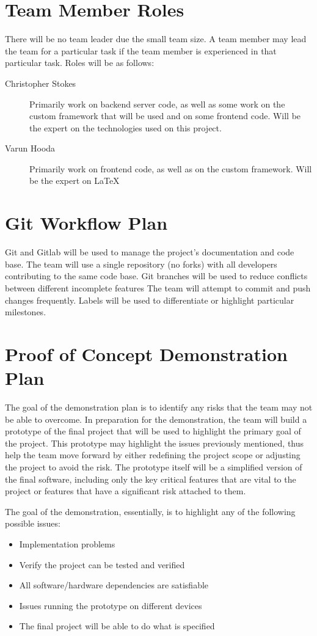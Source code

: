 \documentclass{article}
\begin{document}
\section{Team Member Roles}
There will be no team leader due the small team size. A team member may lead
the team for a particular task if the team member is experienced in that
particular task.
Roles will be as follows:
\begin{description}
  \item[Christopher Stokes] Primarily work on backend server code, as well as
    some work on the custom framework that will be used and on some frontend
    code. Will be the expert on the technologies used on this project.
  \item[Varun Hooda] Primarily work on frontend code, as well as on the custom
    framework. Will be the expert on \LaTeX
\end{description}

\section{Git Workflow Plan}
Git and Gitlab will be used to manage the project's documentation and code
base. The team will use a single repository (no forks) with all developers
contributing to the same code base. Git branches will be used to reduce
conflicts between different incomplete features The team will attempt to commit
and push changes frequently. Labels will be used to differentiate or highlight
particular milestones.

\section{Proof of Concept Demonstration Plan}
The goal of the demonstration plan is to identify any risks that the team may
not be able to overcome. In preparation for the demonstration, the team will
build a prototype of the final project that will be used to highlight the
primary goal of the project. This prototype may highlight the issues previously
mentioned, thus help the team move forward by either redefining the project
scope or adjusting the project to avoid the risk. The prototype itself will be
a simplified version of the final software, including only the key critical
features that are vital to the project or features that have a significant risk
attached to them.

The goal of the demonstration, essentially, is to highlight any of the
following possible issues:
\begin{itemize}
  \item Implementation problems
  \item Verify the project can be tested and verified
  \item All software/hardware dependencies are satisfiable
  \item Issues running the prototype on different devices
  \item The final project will be able to do what is specified
\end{itemize}
\end{document}
